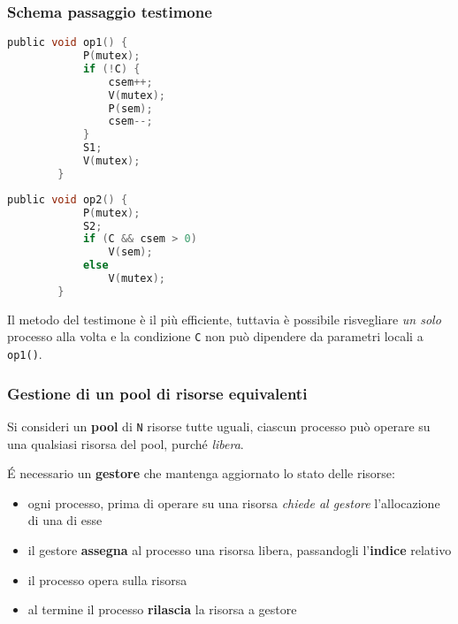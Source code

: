 \subsubsection{Schema passaggio testimone}

\begin{multicols}{2}
    \begin{lstlisting}[language=C]
        public void op1() {
            P(mutex);
            if (!C) {
                csem++;
                V(mutex);
                P(sem);
                csem--;
            }
            S1;
            V(mutex);
        }
    \end{lstlisting}
    \columnbreak
    \begin{lstlisting}[language=C]
        public void op2() {
            P(mutex);
            S2;
            if (C && csem > 0)
                V(sem);
            else
                V(mutex);
        }
    \end{lstlisting}
\end{multicols}

Il metodo del testimone è il più efficiente, tuttavia è possibile risvegliare \textit{un solo} processo alla volta e la condizione \texttt{C} non può dipendere da parametri locali a \texttt{op1()}.

\subsubsection{Gestione di un pool di risorse equivalenti}

Si consideri un \textbf{pool} di \texttt{N} risorse tutte uguali, ciascun processo può operare su una qualsiasi risorsa del pool, purché \textit{libera}.

É necessario un \textbf{gestore} che mantenga aggiornato lo stato delle risorse:
\begin{itemize}
    \item ogni processo, prima di operare su una risorsa \textit{chiede al gestore} l'allocazione di una di esse
    \item il gestore \textbf{assegna} al processo una risorsa libera, passandogli l'\textbf{indice} relativo
    \item il processo opera sulla risorsa
    \item al termine il processo \textbf{rilascia} la risorsa a gestore
\end{itemize}

